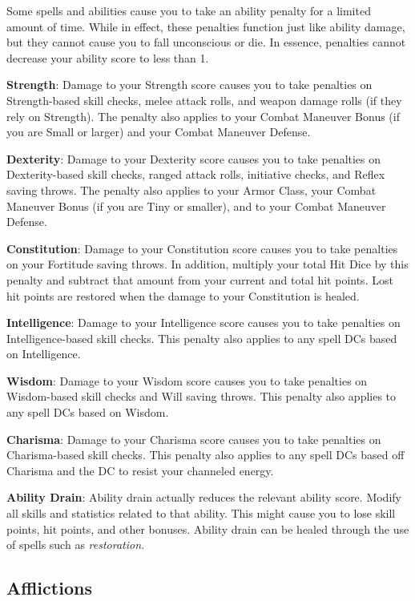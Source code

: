 Some spells and abilities cause you to take an ability penalty for a limited amount of time. While in effect, these penalties function just like ability damage, but they cannot cause you to fall unconscious or die. In essence, penalties cannot decrease your ability score to less than 1.
				
\textbf{Strength}: Damage to your Strength score causes you to take penalties on Strength-based skill checks, melee attack rolls, and weapon damage rolls (if they rely on Strength). The penalty also applies to your Combat Maneuver Bonus (if you are Small or larger) and your Combat Maneuver Defense.
				
\textbf{Dexterity}: Damage to your Dexterity score causes you to take penalties on Dexterity-based skill checks, ranged attack rolls, initiative checks, and Reflex saving throws. The penalty also applies to your Armor Class, your Combat Maneuver Bonus (if you are Tiny or smaller), and to your Combat Maneuver Defense.
				
\textbf{Constitution}: Damage to your Constitution score causes you to take penalties on your Fortitude saving throws. In addition, multiply your total Hit Dice by this penalty and subtract that amount from your current and total hit points. Lost hit points are restored when the damage to your Constitution is healed.
				
\textbf{Intelligence}: Damage to your Intelligence score causes you to take penalties on Intelligence-based skill checks. This penalty also applies to any spell DCs based on Intelligence.
				
\textbf{Wisdom}: Damage to your Wisdom score causes you to take penalties on Wisdom-based skill checks and Will saving throws. This penalty also applies to any spell DCs based on Wisdom.
				
\textbf{Charisma}: Damage to your Charisma score causes you to take penalties on Charisma-based skill checks. This penalty also applies to any spell DCs based off Charisma and the DC to resist your channeled energy.
				
\textbf{Ability Drain}: Ability drain actually reduces the relevant ability score. Modify all skills and statistics related to that ability. This might cause you to lose skill points, hit points, and other bonuses. Ability drain can be healed through the use of spells such as \textit{restoration.}
								
\subsection{Afflictions}

